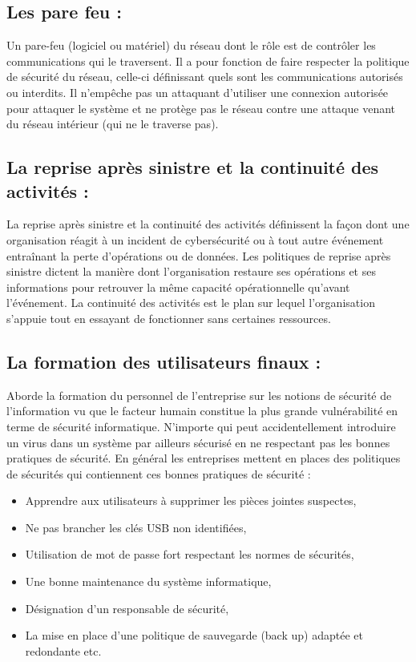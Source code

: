 \subsection{Les pare feu : }
Un pare-feu (logiciel ou matériel) du réseau dont le rôle est de contrôler les communications qui le traversent. Il a pour fonction de faire respecter la politique de sécurité du réseau, celle-ci définissant quels sont les communications autorisés ou interdits. Il n'empêche pas un attaquant d'utiliser une connexion autorisée pour attaquer le système et ne protège pas le réseau contre une attaque venant du réseau intérieur (qui ne le traverse pas).
\subsection{La reprise après sinistre et la continuité des activités : }
La reprise après sinistre et la continuité des activités définissent la façon dont une organisation réagit à un incident de cybersécurité ou à tout autre événement entraînant la perte d'opérations ou de données. Les politiques de reprise après sinistre dictent la manière dont l'organisation restaure ses opérations et ses informations pour retrouver la même capacité opérationnelle qu'avant l'événement. La continuité des activités est le plan sur lequel l'organisation s'appuie tout en essayant de fonctionner sans certaines ressources.
\subsection{La formation des utilisateurs finaux : }
Aborde la formation du personnel de l’entreprise sur les notions de sécurité de l'information vu que le facteur humain constitue la plus grande vulnérabilité en terme de sécurité informatique. N'importe qui peut accidentellement introduire un virus dans un système par ailleurs sécurisé en ne respectant pas les bonnes pratiques de sécurité. En général les entreprises mettent en places des politiques de sécurités qui contiennent ces bonnes pratiques de sécurité :
\begin{itemize}
\item Apprendre aux utilisateurs à supprimer les pièces jointes suspectes,
\item Ne pas brancher les clés USB non identifiées,
\item Utilisation de mot de passe fort respectant les normes de sécurités,
\item Une bonne maintenance du système informatique,
\item Désignation d’un responsable de sécurité,
\item La mise en place d’une politique de sauvegarde (back up) adaptée et redondante etc.
\end{itemize}
